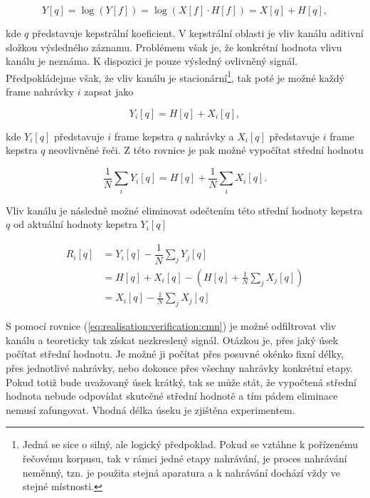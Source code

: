 \begin{equation}
  Y\left[q\right] = \log\left(Y\left[f\right]\right) = \log\left(X\left[f\right] \cdot H\left[f\right]\right) = X\left[q\right] + H\left[q\right],
\end{equation}

\noindent kde $q$ představuje kepstrální koeficient. V kepstrální oblasti je vliv kanálu aditivní složkou výsledného záznamu. Problémem však je, že konkrétní hodnota vlivu kanálu je neznáma. K dispozici je pouze výsledný ovlivněný signál. Předpokládejme však, že vliv kanálu je stacionární\footnote{Jedná se sice o silný, ale logický předpoklad. Pokud se vztáhne k pořízenému řečovému korpusu, tak v rámci jedné etapy nahrávání, je proces nahrávání neměnný, tzn. je použita stejná aparatura a k nahrávání dochází vždy ve stejné místnosti.}, tak poté je možné každý frame nahrávky $i$ zapsat jako

\begin{equation}
  Y_i\left[q\right] = H\left[q\right] + X_i\left[q\right],
\end{equation}

\noindent kde $Y_i\left[q\right]$ představuje $i$ frame kepstra $q$ nahrávky a $X_i\left[q\right]$ představuje $i$ frame kepstra $q$ neovlivněné řeči. Z této rovnice je pak možné vypočítat střední hodnotu

\begin{equation}
  \frac{1}{N} \sum_i Y_i\left[q\right] = H\left[q\right] + \frac{1}{N} \sum_i X_i\left[q\right].
\end{equation}

\noindent Vliv kanálu je následně možné eliminovat odečtením této střední hodnoty kepstra $q$ od aktuální hodnoty kepstra $Y_i\left[q\right]$

\begin{align}
  R_i\left[q\right] &= Y_i\left[q\right] - \dfrac{1}{N}\sum_{j} Y_j\left[q\right] \nonumber  \\
  &= H\left[q\right] + X_i\left[q\right] - \left( H\left[q\right] + \frac{1}{N} \sum_j X_j\left[q\right] \right) \nonumber  \\
  &= X_i\left[q\right] - \frac{1}{N} \sum_j X_j\left[q\right]
  \label{eq:realisation:verification:cmn}
\end{align}

\noindent S pomocí rovnice (\ref{eq:realisation:verification:cmn}) je možné odfiltrovat vliv kanálu a teoreticky tak získat nezkreslený signál. Otázkou je, přes jaký úsek počítat střední hodnotu. Je možné ji počítat přes posuvné okénko fixní délky, přes jednotlivé nahrávky, nebo dokonce přes všechny nahrávky konkrétní etapy. Pokud totiž bude uvažovaný úsek krátký, tak se může stát, že vypočtená střední hodnota nebude odpovídat skutečné střední hodnotě a tím pádem eliminace nemusí zafungovat. Vhodná délka úseku je zjištěna experimentem.

